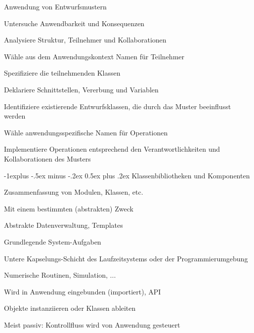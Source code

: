 \documentclass[a4paper]{article}
\makeatletter
\renewcommand{\subsection}{\@startsection{subsection}{2}{0mm}%
                                {-1explus -.5ex minus -.2ex}%
                                {0.5ex plus .2ex}%
                                {\normalfont\normalsize\bfseries}}
\makeatother
\begin{document}
\begin{multicols}{3}
  Anwendung von Entwurfsmustern
  \begin{itemize*}
    \item Untersuche Anwendbarkeit und Konsequenzen
    \item Analysiere Struktur, Teilnehmer und Kollaborationen
    \item Wähle aus dem Anwendungskontext Namen für Teilnehmer
    \item Spezifiziere die teilnehmenden Klassen
    \begin{itemize*}
      \item Deklariere Schnittstellen, Vererbung und Variablen
      \item Identifiziere existierende Entwurfsklassen, die durch das Muster beeinflusst werden
    \end{itemize*}
    \item Wähle anwendungsspezifische Namen für Operationen
    \item Implementiere Operationen entsprechend den Verantwortlichkeiten und Kollaborationen des Musters
  \end{itemize*}

  \subsection{Klassenbibliotheken und Komponenten}
  \begin{itemize*}
    \item Zusammenfassung von Modulen, Klassen, etc.
    \item Mit einem bestimmten (abstrakten) Zweck
    \begin{itemize*}
      \item Abstrakte Datenverwaltung, Templates
      \item Grundlegende System-Aufgaben
      \item Untere Kapselungs-Schicht des Laufzeitsystems oder der Programmierumgebung
      \item Numerische Routinen, Simulation, ...
    \end{itemize*}
    \item Wird in Anwendung eingebunden (importiert), API
      \item Objekte instanziieren oder Klassen ableiten
    \item Meist passiv: Kontrollfluss wird von Anwendung gesteuert
  \end{itemize*}


\end{multicols}
\end{document}
